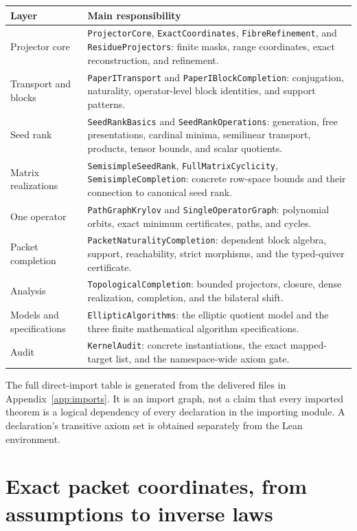 \documentclass[11pt,a4paper]{article}
\newcommand{\code}[1]{\nolinkurl{#1}}
\begin{document}
\begin{longtable}{p{}p{}}
\toprule Layer & Main responsibility \\\midrule\endhead
Projector core & \code{ProjectorCore}, \code{ExactCoordinates}, \code{FibreRefinement}, and \code{ResidueProjectors}: finite masks, range coordinates, exact reconstruction, and refinement. \\
Transport and blocks & \code{PaperITransport} and \code{PaperIBlockCompletion}: conjugation, naturality, operator-level block identities, and support patterns. \\
Seed rank & \code{SeedRankBasics} and \code{SeedRankOperations}: generation, free presentations, cardinal minima, semilinear transport, products, tensor bounds, and scalar quotients. \\
Matrix realizations & \code{SemisimpleSeedRank}, \code{FullMatrixCyclicity}, \code{SemisimpleCompletion}: concrete row-space bounds and their connection to canonical seed rank. \\
One operator & \code{PathGraphKrylov} and \code{SingleOperatorGraph}: polynomial orbits, exact minimum certificates, paths, and cycles. \\
Packet completion & \code{PacketNaturalityCompletion}: dependent block algebra, support, reachability, strict morphisms, and the typed-quiver certificate. \\
Analysis & \code{TopologicalCompletion}: bounded projectors, closure, dense realization, completion, and the bilateral shift. \\
Models and specifications & \code{EllipticAlgorithms}: the elliptic quotient model and the three finite mathematical algorithm specifications. \\
Audit & \code{KernelAudit}: concrete instantiations, the exact mapped-target list, and the namespace-wide axiom gate. \\
\bottomrule
\end{longtable}

The full direct-import table is generated from the delivered files in Appendix~\ref{app:imports}. It is an import graph, not a claim that every imported theorem is a logical dependency of every declaration in the importing module. A declaration's transitive axiom set is obtained separately from the Lean environment.

\section{Exact packet coordinates, from assumptions to inverse laws}\label{sec:packets}
\end{document}
